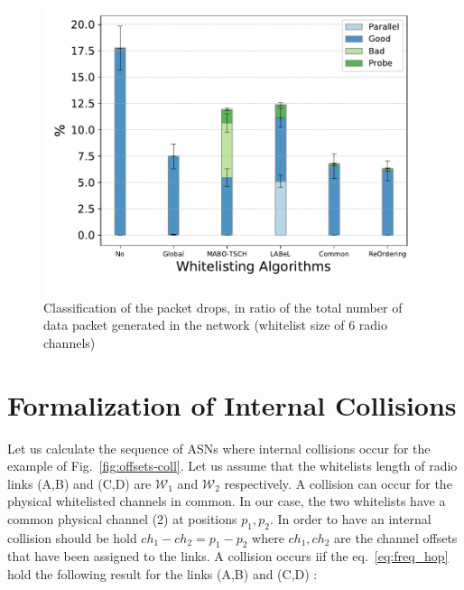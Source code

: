 \documentclass{article}
\begin{document}
\begin{figure}
\centering
	\includegraphics[width=0.99\linewidth]{graphs/collisions_type_10}
	\caption{Classification of the packet drops, in ratio of the total number of data packet generated in the network (whitelist size of 6 radio channels)}
	\label{fig:drop_type}
\end{figure}


\section{Formalization of Internal Collisions}
\newcommand{\SFlength}{\mathcal{S}}
\newcommand{\WhiteLstLengthA}{\mathcal{W}_1}
\newcommand{\WhiteLstLengthB}{\mathcal{W}_2}
\newcommand{\timeslot}{ts}
\newcommand{\positionA}{p_1}
\newcommand{\positionB}{p_2}
\newcommand{\chOffsetA}{ch_1}
\newcommand{\chOffsetB}{ch_2}
\newcommand{\LCM}{f}


Let us calculate the sequence of ASNs where  internal collisions  occur for the example of  Fig.~\ref{fig:offsets-coll}. Let us assume that the whitelists length  of radio links (A,B) and (C,D) are $\WhiteLstLengthA$ and $\WhiteLstLengthB$ respectively. A collision can occur for the physical whitelisted channels in common. In our case, the two whitelists have a common physical channel (2) at positions $\positionA,\positionB$.
In order to have an internal collision should be hold  $\chOffsetA -\chOffsetB = \positionA -\positionB$ where $\chOffsetA,\chOffsetB$ are the channel offsets that have been assigned to the links.
A collision occurs iif the eq.~\ref{eq:freq_hop} hold the following result for the links (A,B) and (C,D) :
\end{document}
